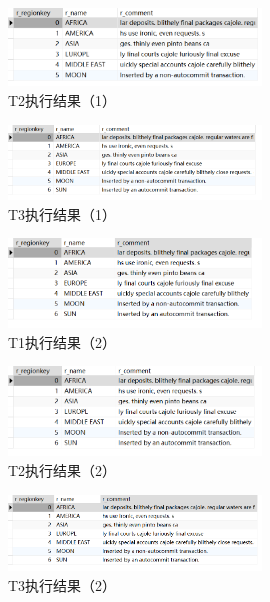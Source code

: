 \documentclass{article}
\begin{document}
\begin{figure}[H]
  \centering
  \includegraphics[width=0.6\textwidth]{img/14.png}
  \caption{T2执行结果（1）}
\end{figure}

\begin{figure}[H]
  \centering
  \includegraphics[width=0.6\textwidth]{img/15.png}
  \caption{T3执行结果（1）}
\end{figure}

\begin{figure}[H]
  \centering
  \includegraphics[width=0.6\textwidth]{img/16.png}
  \caption{T1执行结果（2）}
\end{figure}

\begin{figure}[H]
  \centering
  \includegraphics[width=0.6\textwidth]{img/17.png}
  \caption{T2执行结果（2）}
\end{figure}

\begin{figure}[H]
  \centering
  \includegraphics[width=0.6\textwidth]{img/18.png}
  \caption{T3执行结果（2）}
\end{figure}
\end{document}
